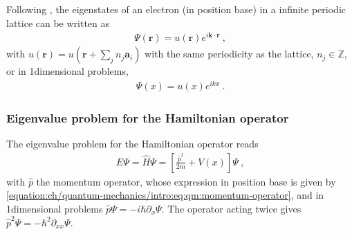 \documentclass[letterpaper,10pt,english]{jupyterBook}
\begin{document}
\sphinxAtStartPar
Following {\hyperref[\detokenize{ch/solid-state/notes-solid-state:solid-state-crystals-bloch-thm}]{}}, the eigen\sphinxhyphen{}states of an electron (in position base) in a infinite periodic lattice can be written as
\begin{equation*}
\begin{split}\Psi(\mathbf{r}) = u(\mathbf{r}) e^{i \mathbf{k} \cdot \mathbf{r}} \ ,\end{split}
\end{equation*}
\sphinxAtStartPar
with \(u(\mathbf{r}) = u \left(\mathbf{r} + \sum_j n_j \mathbf{a}_i \right)\) with the same periodicity as the lattice, \(n_j \in \mathbb{Z}\), or in 1\sphinxhyphen{}dimensional problems,
\begin{equation*}
\begin{split}\Psi(x) = u(x) e^{i k x} \ .\end{split}
\end{equation*}\subsubsection*{Eigenvalue problem for the Hamiltonian operator}

\sphinxAtStartPar
The eigenvalue problem for the Hamiltonian operator reads
\begin{equation*}
\begin{split}E \Psi = \hat{H}  \Psi = \left[ \frac{\hat{p}^2}{2m} + V(x) \right] \Psi \ ,\end{split}
\end{equation*}
\sphinxAtStartPar
with \(\hat{p}\) the momentum operator, whose expression in position base is given by \eqref{equation:ch/quantum-mechanics/intro:eq:qm:momentum-operator}, and in 1\sphinxhyphen{}dimensional problems \(\hat{p} \Psi = - i \hbar \partial_x \Psi\). The operator acting twice gives \(\hat{p}^2 \Psi = - \hbar^2 \partial_{xx} \Psi\).
\end{document}
